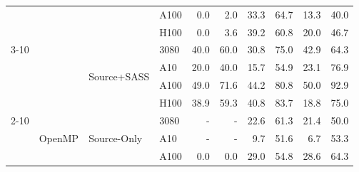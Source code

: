 \begin{tabular}{@{}llllrrrrrr@{}}
 &  &  & A100 & \cellcolor[rgb]{1.000,1.000,1.000}0.0 & \cellcolor[rgb]{1.000,0.998,0.998}2.0 & \cellcolor[rgb]{1.000,0.828,0.828}33.3 & \cellcolor[rgb]{1.000,0.502,0.502}64.7 & \cellcolor[rgb]{1.000,0.960,0.960}13.3 & \cellcolor[rgb]{1.000,0.769,0.769}40.0 \\
 &  &  & H100 & \cellcolor[rgb]{1.000,1.000,1.000}0.0 & \cellcolor[rgb]{1.000,0.995,0.995}3.6 & \cellcolor[rgb]{1.000,0.777,0.777}39.2 & \cellcolor[rgb]{1.000,0.549,0.549}60.8 & \cellcolor[rgb]{1.000,0.924,0.924}20.0 & \cellcolor[rgb]{1.000,0.704,0.704}46.7 \\
\cmidrule(lr){3-10}
 &  & \multirow{4}{*}{Source+SASS} & 3080 & \cellcolor[rgb]{1.000,0.769,0.769}40.0 & \cellcolor[rgb]{1.000,0.558,0.558}60.0 & \cellcolor[rgb]{1.000,0.848,0.848}30.8 & \cellcolor[rgb]{1.000,0.369,0.369}75.0 & \cellcolor[rgb]{1.000,0.742,0.742}42.9 & \cellcolor[rgb]{1.000,0.507,0.507}64.3 \\
 &  &  & A10 & \cellcolor[rgb]{1.000,0.924,0.924}20.0 & \cellcolor[rgb]{1.000,0.769,0.769}40.0 & \cellcolor[rgb]{1.000,0.948,0.948}15.7 & \cellcolor[rgb]{1.000,0.617,0.617}54.9 & \cellcolor[rgb]{1.000,0.904,0.904}23.1 & \cellcolor[rgb]{1.000,0.343,0.343}76.9 \\
 &  &  & A100 & \cellcolor[rgb]{1.000,0.681,0.681}49.0 & \cellcolor[rgb]{1.000,0.414,0.414}71.6 & \cellcolor[rgb]{1.000,0.729,0.729}44.2 & \cellcolor[rgb]{1.000,0.289,0.289}80.8 & \cellcolor[rgb]{1.000,0.670,0.670}50.0 & \cellcolor[rgb]{1.000,0.111,0.111}92.9 \\
 &  &  & H100 & \cellcolor[rgb]{1.000,0.779,0.779}38.9 & \cellcolor[rgb]{1.000,0.567,0.567}59.3 & \cellcolor[rgb]{1.000,0.762,0.762}40.8 & \cellcolor[rgb]{1.000,0.248,0.248}83.7 & \cellcolor[rgb]{1.000,0.931,0.931}18.8 & \cellcolor[rgb]{1.000,0.369,0.369}75.0 \\
\cmidrule(lr){2-10}
 & \multirow{8}{*}{OpenMP} & \multirow{4}{*}{Source-Only} & 3080 & \cellcolor[rgb]{1.000,1.000,1.000}- & \cellcolor[rgb]{1.000,1.000,1.000}- & \cellcolor[rgb]{1.000,0.907,0.907}22.6 & \cellcolor[rgb]{1.000,0.543,0.543}61.3 & \cellcolor[rgb]{1.000,0.915,0.915}21.4 & \cellcolor[rgb]{1.000,0.670,0.670}50.0 \\
 &  &  & A10 & \cellcolor[rgb]{1.000,1.000,1.000}- & \cellcolor[rgb]{1.000,1.000,1.000}- & \cellcolor[rgb]{1.000,0.976,0.976}9.7 & \cellcolor[rgb]{1.000,0.653,0.653}51.6 & \cellcolor[rgb]{1.000,0.987,0.987}6.7 & \cellcolor[rgb]{1.000,0.635,0.635}53.3 \\
 &  &  & A100 & \cellcolor[rgb]{1.000,1.000,1.000}0.0 & \cellcolor[rgb]{1.000,1.000,1.000}0.0 & \cellcolor[rgb]{1.000,0.862,0.862}29.0 & \cellcolor[rgb]{1.000,0.618,0.618}54.8 & \cellcolor[rgb]{1.000,0.865,0.865}28.6 & \cellcolor[rgb]{1.000,0.507,0.507}64.3 \\

\end{tabular}
